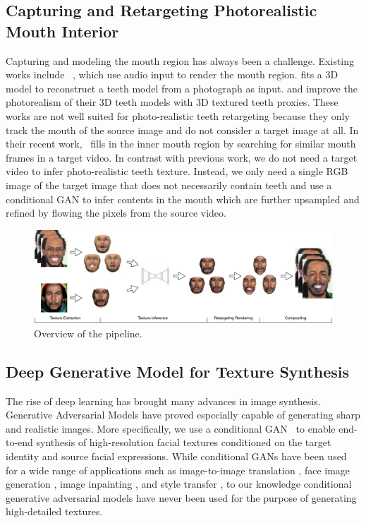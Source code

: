 \subsection{Capturing and Retargeting Photorealistic Mouth Interior}
Capturing and modeling the mouth region has always been a challenge. Existing works include ~\cite{Chuang:2005:MSE,Wampler:2007:DES,Taylor:2012:DUV,FanWSX15,edwardsjali}, which use audio input to render the mouth region. \cite{wu2016model} fits a 3D model to reconstruct a teeth model from a photograph as input. 
\cite{garrido2015vdub} and \cite{thies2015real} improve the photorealism of their 3D teeth models with 3D textured teeth proxies.
These works are not well suited for photo-realistic teeth retargeting because they only track the mouth of the source image and do not consider a target image at all.
 In their recent work,~\cite{f2f} fills in the inner mouth region by searching for similar mouth frames in a target video.  
In contrast with previous work, we do not need a target video to infer photo-realistic teeth texture. 
Instead, we only need a single RGB image of the target image that does not necessarily contain teeth and use a conditional GAN to infer contents in the mouth which are further upsampled and refined by flowing the pixels from the source video.   

\begin{figure}[t]
	\centering
	\includegraphics[width=1\linewidth]{figures/overview/overview.pdf}
	\caption{Overview of the pipeline.}\label{fig:arch_content}
	\vspace{-0.15in}
\end{figure}


\subsection{Deep Generative Model for Texture Synthesis}

The rise of deep learning has brought many advances in image synthesis. Generative Adversarial Models \cite{gan} have proved especially capable of generating sharp and realistic images. 
More specifically, we use a conditional GAN~\cite{cgan} to enable end-to-end synthesis of high-resolution facial textures conditioned on the target identity and source facial expressions. While conditional GANs have been used for a wide range of applications such as image-to-image translation \cite{pix2pix}, face image generation \cite{gauthier2014}, image inpainting \cite{pathak2016context, yang2016high}, and style transfer \cite{li2016precomputed}, to our knowledge conditional generative adversarial models have never been used for the purpose of generating high-detailed textures.

